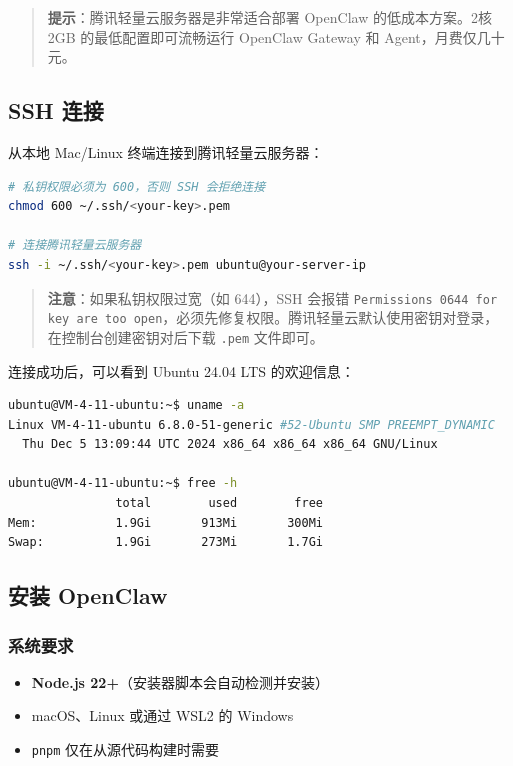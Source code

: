 \begin{quote}
\textbf{提示}：腾讯轻量云服务器是非常适合部署 OpenClaw 的低成本方案。2核2GB 的最低配置即可流畅运行 OpenClaw Gateway 和 Agent，月费仅几十元。
\end{quote}

\subsection{SSH 连接}


从本地 Mac/Linux 终端连接到腾讯轻量云服务器：

\begin{lstlisting}[language=bash]
# 私钥权限必须为 600，否则 SSH 会拒绝连接
chmod 600 ~/.ssh/<your-key>.pem

# 连接腾讯轻量云服务器
ssh -i ~/.ssh/<your-key>.pem ubuntu@your-server-ip
\end{lstlisting}

\begin{quote}
\textbf{注意}：如果私钥权限过宽（如 644），SSH 会报错 \texttt{Permissions 0644 for key are too open}，必须先修复权限。腾讯轻量云默认使用密钥对登录，在控制台创建密钥对后下载 \texttt{.pem} 文件即可。
\end{quote}

连接成功后，可以看到 Ubuntu 24.04 LTS 的欢迎信息：

\begin{lstlisting}[language=bash]
ubuntu@VM-4-11-ubuntu:~$ uname -a
Linux VM-4-11-ubuntu 6.8.0-51-generic #52-Ubuntu SMP PREEMPT_DYNAMIC
  Thu Dec 5 13:09:44 UTC 2024 x86_64 x86_64 x86_64 GNU/Linux

ubuntu@VM-4-11-ubuntu:~$ free -h
               total        used        free
Mem:           1.9Gi       913Mi       300Mi
Swap:          1.9Gi       273Mi       1.7Gi
\end{lstlisting}

\subsection{安装 OpenClaw}

\subsubsection{系统要求}

\begin{itemize}
  \item \textbf{Node.js 22+}（安装器脚本会自动检测并安装）
  \item macOS、Linux 或通过 WSL2 的 Windows
  \item \texttt{pnpm} 仅在从源代码构建时需要
\end{itemize}

